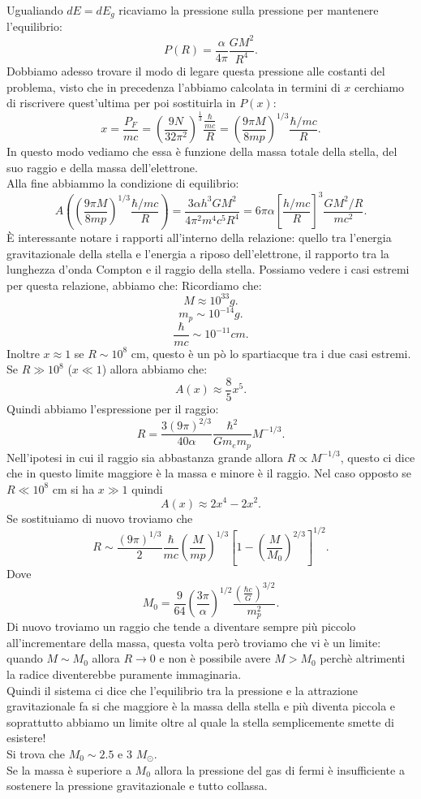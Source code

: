 Ugualiando $dE = dE_{g}$ ricaviamo la pressione sulla pressione per mantenere l'equilibrio:
\[
	P( R) = \frac{\alpha }{4\pi}\frac{GM^2}{R^4}
.\] 
Dobbiamo adesso trovare il modo di legare questa pressione alle costanti del problema, visto che in precedenza l'abbiamo calcolata in termini di $x$ cerchiamo di riscrivere quest'ultima per poi sostituirla in $P( x) $:
\[
	x = \frac{P_{F}}{mc} = \left( \frac{9N}{32 \pi^2} \right) ^{\frac{1}{3}}
	\frac{\frac{\hbar}{mc}}{R} =
	\left( \frac{9\pi M}{8mp}\right)^{1 /3} \frac{\hbar /mc}{R} 
.\] 
In questo modo vediamo che essa è funzione della massa totale della stella, del suo raggio e della massa dell'elettrone.\\
Alla fine abbiammo la condizione di equilibrio:
\[
	A( \left( \frac{9\pi M}{8mp}\right)^{1 /3} \frac{\hbar /mc}{R} ) =
	\frac{3\alpha h^3GM^2}{4\pi^2m ^{4}c^{5}R^{4}} = 
	6\pi\alpha \left[ \frac{h /mc}{R} \right] ^3 \frac{GM^2 /R}{mc^2}
.\] 
È interessante notare i rapporti all'interno della relazione: quello tra l'energia gravitazionale della stella e l'energia a riposo dell'elettrone, il rapporto tra la lunghezza d'onda Compton e il raggio della stella. Possiamo vedere i casi estremi per questa relazione, abbiamo che:
Ricordiamo che:
\[
	M \approx 10^{33} g
.\] 
\[
	m_{p}\sim 10^{-14}g
.\] 
\[
	\frac{\hbar}{mc}\sim 10^{-11} cm
.\] 
Inoltre $x \approx 1$ se $R \sim 10^{8}$ cm, questo è un pò lo spartiacque tra i due casi estremi.\\
Se $R \gg 10^{8}$ ($x \ll 1$) allora abbiamo che:
\[
	A( x) \approx \frac{8}{5}x^{5}
.\] 
Quindi abbiamo l'espressione per il raggio:
\[
	R = \frac{3 \left( 9\pi \right) ^{2 /3}}{40\alpha }\frac{\hbar^2}{Gm_{e}m_{p}}M^{-1 /3}
.\] 
Nell'ipotesi in cui il raggio sia abbastanza grande allora $R \propto M^{-1 /3}$, questo ci dice che in questo limite maggiore è la massa e minore è il raggio.
Nel caso opposto se $R \ll 10^{8}$ cm si ha $x \gg 1$ quindi 
\[
	A( x)  \approx 2x^{4} - 2 x^2
.\] Se sostituiamo di nuovo troviamo che
\[
	R \sim \frac{\left( 9\pi \right) ^{1 /3}}{2} \frac{\hbar}{mc} \left( \frac{M}{mp} \right) ^{1 /3} \left[ 1- \left( \frac{M}{M_0} \right) ^{2 /3} \right] ^{1 /2}
.\] 
Dove 
 \[
	 M_0 = \frac{9}{64} \left( \frac{3\pi}{\alpha } \right) ^{1 /2} \frac{\left( \frac{\hbar c}{G} \right) ^{3 /2}}{m_{p}^2}
.\] 
Di nuovo troviamo un raggio che tende a diventare sempre più piccolo all'incrementare della massa, questa volta però troviamo che vi è un limite: quando $M \sim M_0$ allora $R \to 0$ e non è possibile avere $M > M_0$ perchè altrimenti la radice diventerebbe puramente immaginaria.\\
Quindi il sistema ci dice che l'equilibrio tra la pressione e la attrazione gravitazionale fa si che maggiore è la massa della stella e più diventa piccola e soprattutto abbiamo un limite oltre al quale la stella semplicemente smette di esistere!\\
Si trova che $M_0 \sim 2.5 $ e $3$ $M_{\odot}$. \\
Se la massa è superiore a $M_0$ allora la pressione del gas di fermi è insufficiente a sostenere la pressione gravitazionale e tutto collassa.
